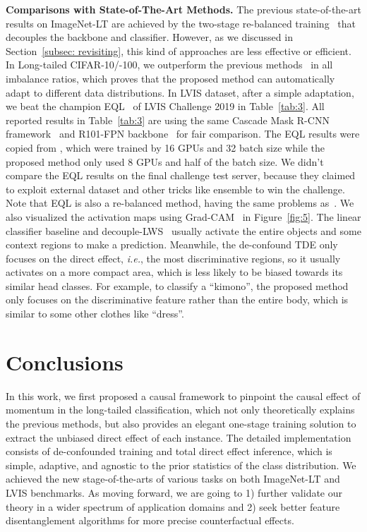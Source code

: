 \documentclass{article}
\newcommand{\ie}{\textit{i.e.}}
\begin{document}
\textbf{Comparisons with State-of-The-Art Methods.} The previous state-of-the-art results on ImageNet-LT are achieved by the two-stage re-balanced training~\cite{kang2019decoupling} that decouples the backbone and classifier. However, as we discussed in Section~\ref{subsec: revisiting}, this kind of approaches are less effective or efficient. In Long-tailed CIFAR-10/-100, we outperform the previous methods~\cite{cui2019class, cao2019learning, zhou2019bbn} in all imbalance ratios, which proves that the proposed method can automatically adapt to different data distributions. In LVIS dataset, after a simple adaptation, we beat the champion EQL~\cite{tan2020equalization} of LVIS Challenge 2019 in Table~\ref{tab:3}. All reported results in Table~\ref{tab:3} are using the same Cascade Mask R-CNN framework~\cite{cai2018cascade} and R101-FPN backbone~\cite{lin2017feature} for fair comparison. The EQL results were copied from \cite{tan2020equalization}, which were trained by 16 GPUs and 32 batch size while the proposed method only used 8 GPUs and half of the batch size. We didn't compare the EQL results on the final challenge test server, because they claimed to exploit external dataset and other tricks like ensemble to win the challenge. Note that EQL is also a re-balanced method, having the same problems as~\cite{kang2019decoupling}. We also visualized the activation maps using Grad-CAM~\cite{selvaraju2017grad} in Figure~\ref{fig:5}. The linear classifier baseline and decouple-LWS~\cite{kang2019decoupling} usually activate the entire objects and some context regions to make a prediction. Meanwhile, the de-confound TDE only focuses on the direct effect, \ie, the most discriminative regions, so it usually activates on a more compact area, which is less likely to be biased towards its similar head classes. For example, to classify a ``kimono'', the proposed method only focuses on the discriminative feature rather than the entire body, which is similar to some other clothes like ``dress''.




\vspace{-2mm}
\section{Conclusions}
\vspace{-2mm}
In this work, we first proposed a causal framework to pinpoint the causal effect of momentum in the long-tailed classification, which not only theoretically explains the previous methods, but also provides an elegant one-stage training solution to extract the unbiased direct effect of each instance. The detailed implementation consists of de-confounded training and total direct effect inference, which is simple, adaptive, and agnostic to the prior statistics of the class distribution. We achieved the new stage-of-the-arts of various tasks on both ImageNet-LT and LVIS benchmarks. As moving forward, we are going to 1) further validate our theory in a wider spectrum of application domains and 2) seek better feature disentanglement algorithms for more precise counterfactual effects.   
\end{document}
